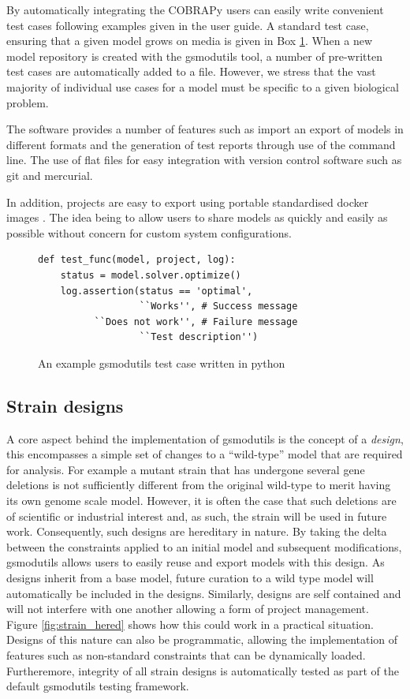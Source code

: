 \documentclass[a4paper,10pt]{article}
\begin{document}
By automatically integrating the COBRAPy \cite{ebrahim2013cobrapy} users can easily write convenient test cases following examples given in the user guide.
A standard test case, ensuring that a given model grows on media is given in Box \ref{fig:test_case}.
When a new model repository is created with the gsmodutils tool, a number of pre-written test cases are automatically added to a file.
However, we stress that the vast majority of individual use cases for a model must be specific to a given biological problem.

The software provides a number of features such as import an export of models in different formats and the generation of test reports through use of the command line. 
The use of flat files for easy integration with version control software such as git and mercurial.

In addition, projects are easy to export using portable standardised docker images \cite{merkel2014docker}. 
The idea being to allow users to share models as quickly and easily as possible without concern for custom system configurations.


\begin{figure}[ht]

\lstset{language=Python}   
\begin{lstlisting}
def test_func(model, project, log):
    status = model.solver.optimize()
    log.assertion(status == 'optimal',
                  ``Works'', # Success message
		  ``Does not work'', # Failure message
                  ``Test description'')
\end{lstlisting}
\label{fig:test_case} 
\caption{An example gsmodutils test case written in python}
\end{figure}

\subsection{Strain designs}
A core aspect behind the implementation of gsmodutils is the concept of a \textit{design}, this encompasses a simple set of changes to a ``wild-type'' model that are required for analysis.
For example a mutant strain that has undergone several gene deletions is not sufficiently different from the original wild-type to merit having its own genome scale model.
However, it is often the case that such deletions are of scientific or industrial interest and, as such, the strain will be used in future work.
Consequently, such designs are hereditary in nature.
By taking the delta between the constraints applied to an initial model and subsequent modifications, gsmodutils allows users to easily reuse and export models with this design.
As designs inherit from a base model, future curation to a wild type model will automatically be included in the designs.
Similarly, designs are self contained and will not interfere with one another allowing a form of project management.
Figure \ref{fig:strain_hered} shows how this could work in a practical situation.
Designs of this nature can also be programmatic, allowing the implementation of features such as non-standard constraints that can be dynamically loaded.
Furtheremore, integrity of all strain designs is automatically tested as part of the default gsmodutils testing framework.
\end{document}
